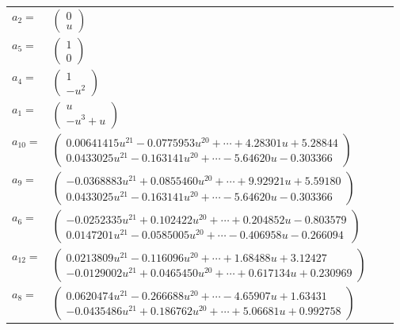 \documentclass[1p]{elsarticle_modified}
\theoremstyle{definition}
\begin{document}
\begin{tabular}{m{7pt} m{180pt} m{7pt} m{180pt} }
\flushright $a_{2}=$&$\begin{pmatrix}0\\u\end{pmatrix}$ \\
\flushright $a_{5}=$&$\begin{pmatrix}1\\0\end{pmatrix}$ \\
\flushright $a_{4}=$&$\begin{pmatrix}1\\- u^2\end{pmatrix}$ \\
\flushright $a_{1}=$&$\begin{pmatrix}u\\- u^3+u\end{pmatrix}$ \\
\flushright $a_{10}=$&$\begin{pmatrix}0.00641415 u^{21}-0.0775953 u^{20}+\cdots+4.28301 u+5.28844\\0.0433025 u^{21}-0.163141 u^{20}+\cdots-5.64620 u-0.303366\end{pmatrix}$ \\
\flushright $a_{9}=$&$\begin{pmatrix}-0.0368883 u^{21}+0.0855460 u^{20}+\cdots+9.92921 u+5.59180\\0.0433025 u^{21}-0.163141 u^{20}+\cdots-5.64620 u-0.303366\end{pmatrix}$ \\
\flushright $a_{6}=$&$\begin{pmatrix}-0.0252335 u^{21}+0.102422 u^{20}+\cdots+0.204852 u-0.803579\\0.0147201 u^{21}-0.0585005 u^{20}+\cdots-0.406958 u-0.266094\end{pmatrix}$ \\
\flushright $a_{12}=$&$\begin{pmatrix}0.0213809 u^{21}-0.116096 u^{20}+\cdots+1.68488 u+3.12427\\-0.0129002 u^{21}+0.0465450 u^{20}+\cdots+0.617134 u+0.230969\end{pmatrix}$ \\
\flushright $a_{8}=$&$\begin{pmatrix}0.0620474 u^{21}-0.266688 u^{20}+\cdots-4.65907 u+1.63431\\-0.0435486 u^{21}+0.186762 u^{20}+\cdots+5.06681 u+0.992758\end{pmatrix}$ \\

\end{tabular}
\end{document}
